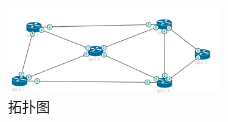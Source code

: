 \begin{figure}[h]
	\centering
	\includegraphics[width=0.5\textwidth]{image/topo1.png}
	\caption{拓扑图}
 	\label{fig:hole}
\end{figure}
